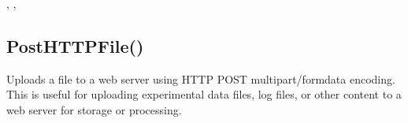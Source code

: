 \documentclass[letterpaper,10pt,english]{sphinxmanual}
\begin{document}
\sphinxAtStartPar
{}

\sphinxAtStartPar
{}, , 

\ignorespaces 

\subsection{PostHTTPFile()}
\label{\detokenize{reference/peblstream:posthttpfile}}\label{\detokenize{reference/peblstream:index-42}}
\sphinxAtStartPar
{}

\sphinxAtStartPar
{}

\sphinxAtStartPar
Uploads a file to a web server using HTTP POST multipart/form\sphinxhyphen{}data encoding. This is useful for uploading experimental data files, log files, or other content to a web server for storage or processing.

\sphinxAtStartPar
{}

\begin{sphinxVerbatim}[commandchars=\\\{\}]
\end{sphinxVerbatim}

\sphinxAtStartPar
{}
\end{document}
